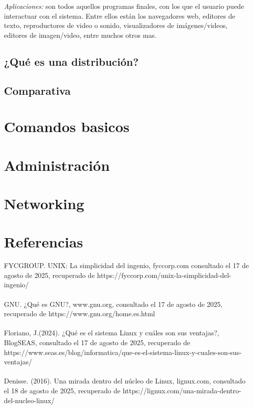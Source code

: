 \documentclass[10pt,a4paper,titlepage]{article}
\begin{document}
	\emph{Aplicaciones:} son todos aquellos programas finales, con los que el usuario puede interactuar con el sistema. Entre ellos están los navegadores web, editores de texto, reproductores de video o sonido, visualizadores de imágenes/videos, editores de imagen/video, entre muchos otros mas.
	
	\subsection*{¿Qué es una distribución?}
	
	\subsection*{Comparativa}
	
	\section*{Comandos basicos}
	
	\section*{Administración}
	
	\section*{Networking}
	
	\section*{Referencias}
	FYCGROUP. UNIX: La simplicidad del ingenio, fyccorp.com consultado el 17 de agosto de 2025, recuperado de https://fyccorp.com/unix-la-simplicidad-del-ingenio/	
	\\
	\\
	GNU. ¿Qué es GNU?, www.gnu.org, consultado el 17 de agosto de 2025, recuperado de https://www.gnu.org/home.es.html
	\\
	\\
	Floriano, J.(2024). ¿Qué es el sistema Linux y cuáles son sus ventajas?, BlogSEAS, consultado el 17 de agosto de 2025, recuperado de https://www.seas.es/blog/informatica/que-es-el-sistema-linux-y-cuales-son-sus-ventajas/
	\\
	\\
	Denisse. (2016). Una mirada dentro del núcleo de Linux, lignux.com, consultado el 18 de agosto de 2025, recuperado de https://lignux.com/una-mirada-dentro-del-nucleo-linux/
	
\end{document}

